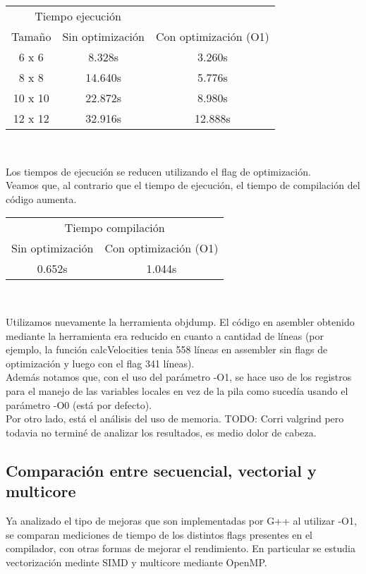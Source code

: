 \begin{center}
	\begin{tabular}{ccc}  
		\toprule 
		\multicolumn{2}{c}{Tiempo ejecución} \\
		\cmidrule(r){1-3}
		Tamaño & Sin optimización & Con optimización (O1)  \\
		\midrule
		6 x 6   &	8.328s 	&	3.260s	\\
		8 x 8	&	14.640s	&	5.776s	\\
		10 x 10	&	22.872s	&	8.980s	\\
		12 x 12 &	32.916s &   12.888s \\
		\bottomrule
	\end{tabular}\\
\end{center}

Los tiempos de ejecución se reducen utilizando el flag de optimización.\\

Veamos que, al contrario que el tiempo de ejecución, el tiempo de compilación del código aumenta.\\

\begin{center}
	\begin{tabular}{cc}  
		\toprule 
		\multicolumn{2}{c}{Tiempo compilación} \\
		\cmidrule(r){1-2}
		Sin optimización & Con optimización (O1) \\
		\midrule
		0.652s	&	1.044s	\\
		\bottomrule
	\end{tabular}\\
\end{center}

Utilizamos nuevamente la herramienta objdump. El código en asembler obtenido mediante la herramienta era reducido en cuanto a cantidad de líneas (por ejemplo, la función calcVelocities tenia 558 líneas en assembler sin flags de optimización y luego con el flag 341 líneas).\\

Además notamos que, con el uso del parámetro -O1, se hace uso de los registros para el manejo de las variables locales en vez de la pila como sucedía usando el parámetro -O0 (está por defecto).\\

Por otro lado, está el análisis del uso de memoria.
TODO: Corri valgrind pero todavia no terminé de analizar los resultados, es medio dolor de cabeza.


\subsection{Comparación entre secuencial, vectorial y multicore}
Ya analizado el tipo de mejoras que son implementadas por G++ al utilizar -O1, se comparan mediciones de tiempo de los distintos flags presentes en el compilador, con otras formas de mejorar el rendimiento. En particular se estudia vectorización medinte SIMD y multicore mediante OpenMP.

